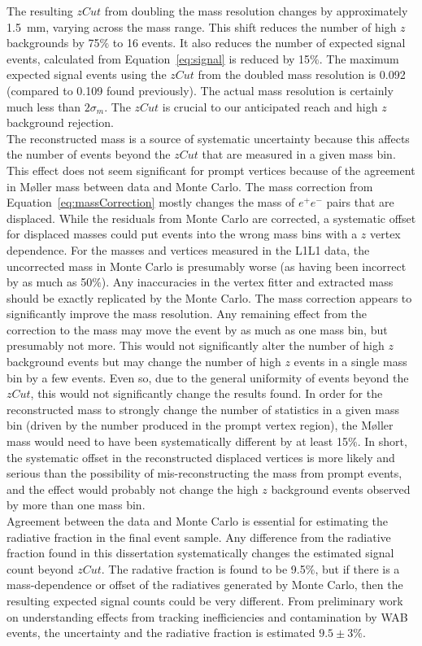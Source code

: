 The resulting $zCut$ from doubling the mass resolution changes by approximately 1.5~mm, varying across the mass range. This shift reduces the number of high $z$ backgrounds by 75$\%$ to 16 events. It also reduces the number of expected signal events, calculated from Equation~\eqref{eq:signal} is reduced by 15$\%$. The maximum expected signal events using the $zCut$ from the doubled mass resolution is 0.092 (compared to 0.109 found previously). The actual mass resolution is certainly much less than $2\sigma_m$. The $zCut$ is crucial to our anticipated reach and high $z$ background rejection.\\
\indent The reconstructed mass is a source of systematic uncertainty because this affects the number of events beyond the $zCut$ that are measured in a given mass bin. This effect does not seem significant for prompt vertices because of the agreement in M\o ller mass between data and Monte Carlo. The mass correction from Equation~\eqref{eq:massCorrection} mostly changes the mass of $e^+e^-$ pairs that are displaced. While the residuals from Monte Carlo are corrected, a systematic offset for displaced masses could put events into the wrong mass bins with a $z$ vertex dependence. For the masses and vertices measured in the L1L1 data, the uncorrected mass in Monte Carlo is presumably worse (as having been incorrect by as much as 50$\%$). Any inaccuracies in the vertex fitter and extracted mass should be exactly replicated by the Monte Carlo. The mass correction appears to significantly improve the mass resolution. Any remaining effect from the correction to the mass may move the event by as much as one mass bin, but presumably not more. This would not significantly alter the number of high $z$ background events but may change the number of high $z$ events in a single mass bin by a few events. Even so, due to the general uniformity of events beyond the $zCut$, this would not significantly change the results found. In order for the reconstructed mass to strongly change the number of statistics in a given mass bin (driven by the number produced in the prompt vertex region), the M\o ller mass would need to have been systematically different by at least 15$\%$. In short, the systematic offset in the reconstructed displaced vertices is more likely and serious than the possibility of mis-reconstructing the mass from prompt events, and the effect would probably not change the high $z$ background events observed by more than one mass bin. \\
\indent Agreement between the data and Monte Carlo is essential for estimating the radiative fraction in the final event sample. Any difference from the radiative fraction found in this dissertation systematically changes the estimated signal count beyond $zCut$. The radative fraction is found to be 9.5$\%$, but if there is a mass-dependence or offset of the radiatives generated by Monte Carlo, then the resulting expected signal counts could be very different. From preliminary work on understanding effects from tracking inefficiencies and contamination by WAB events, the uncertainty and the radiative fraction is estimated $9.5\pm3\%$. 

